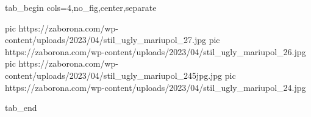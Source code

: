  
 
 
 
 

\ifcmt
  tab_begin cols=4,no_fig,center,separate

     pic https://zaborona.com/wp-content/uploads/2023/04/stil_ugly_mariupol_27.jpg
     pic https://zaborona.com/wp-content/uploads/2023/04/stil_ugly_mariupol_26.jpg
		 pic https://zaborona.com/wp-content/uploads/2023/04/stil_ugly_mariupol_245jpg.jpg
		 pic https://zaborona.com/wp-content/uploads/2023/04/stil_ugly_mariupol_24.jpg

  tab_end
\fi
